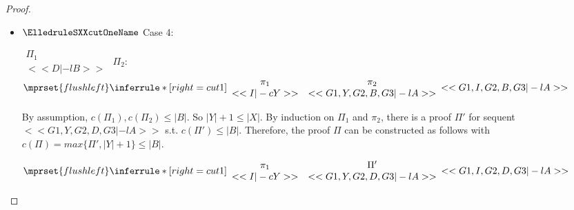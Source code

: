 \begin{proof}
\begin{enumerate}
\begin{itemize}
    \item $\ElledruleSXXcutOneName$ Case 4:
      \begin{center}
        \scriptsize
        \begin{math}
          \begin{array}{c}
            \Pi_1 \\
            {<<D |-l B>>}
          \end{array}
        \end{math}
        \qquad\qquad
        $\Pi_2$:
        \begin{math}
          $$\mprset{flushleft}
          \inferrule* [right={\tiny cut1}] {
            {
              \begin{array}{cc}
                \pi_1 & \pi_2 \\
                {<<I |-c Y>>} & {<<G1, Y, G2, B, G3 |-l A>>}
              \end{array}
            }
          }{<<G1, I, G2, B, G3 |-l A>>}
        \end{math}
      \end{center}
      By assumption, $c(\Pi_1),c(\Pi_2)\leq |B|$. So $|Y|+1 \leq |X|$. By induction on $\Pi_1$
      and $\pi_2$, there is a proof $\Pi'$ for sequent $<<G1, Y, G2, D, G3 |-l A>>$ s.t.
      $c(\Pi') \leq |B|$. Therefore, the proof $\Pi$ can be constructed as follows with
      $c(\Pi) = max\{\Pi', |Y|+1\} \leq |B|$.
      \begin{center}
        \scriptsize
        \begin{math}
          $$\mprset{flushleft}
          \inferrule* [right={\tiny cut1}] {
            {
              \begin{array}{cc}
                \pi_1 & \Pi' \\
                {<<I |-c Y>>} & {<<G1, Y, G2, D, G3 |-l A>>}
              \end{array}
            }
          }{<<G1, I, G2, D, G3 |-l A>>}
        \end{math}
      \end{center}


\end{itemize}
\end{enumerate}
\end{proof}

